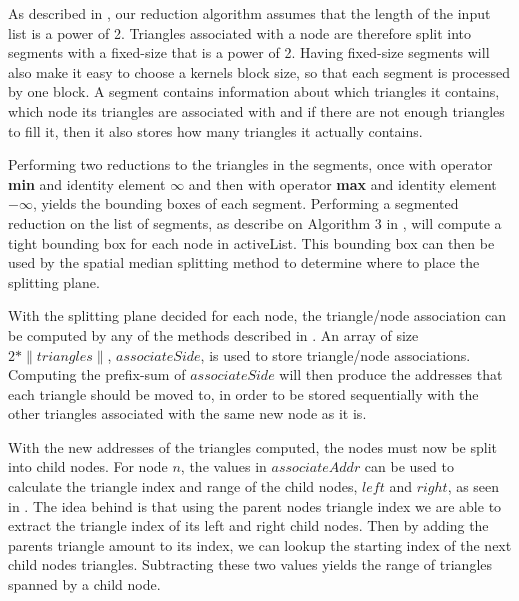 
As described in , our reduction algorithm
assumes that the length of the input list is a power of 2. Triangles
associated with a node are therefore split into segments with a
fixed-size that is a power of 2. Having fixed-size segments will also
make it easy to choose a kernels block size, so that each segment is
processed by one block. A segment contains information about which
triangles it contains, which node its triangles are associated with
and if there are not enough triangles to fill it, then it also stores
how many triangles it actually contains.

Performing two reductions to the triangles in the segments, once with
operator \textbf{min} and identity element $\infty$ and then with
operator \textbf{max} and identity element $-\infty$, yields the
bounding boxes of each segment. Performing a segmented reduction on
the list of segments, as describe on Algorithm 3 in \zhou, will
compute a tight bounding box for each node in activeList. This
bounding box can then be used by the spatial median splitting method
to determine where to place the splitting plane.

With the splitting plane decided for each node, the triangle/node
association can be computed by any of the methods described in
. An array of size $2 * \|triangles\|$,
$associateSide$, is used to store triangle/node
associations. Computing the prefix-sum of $associateSide$ will then
produce the addresses that each triangle should be moved to, in order
to be stored sequentially with the other triangles associated with the
same new node as it is.



With the new addresses of the triangles computed, the nodes must now
be split into child nodes. For node $n$, the values in $associateAddr$
can be used to calculate the triangle index and range of the child
nodes, $left$ and $right$, as seen in . The
idea behind  is that using the parent nodes
triangle index we are able to extract the triangle index of its left
and right child nodes. Then by adding the parents triangle amount to
its index, we can lookup the starting index of the next child nodes
triangles. Subtracting these two values yields the range of triangles
spanned by a child node.

